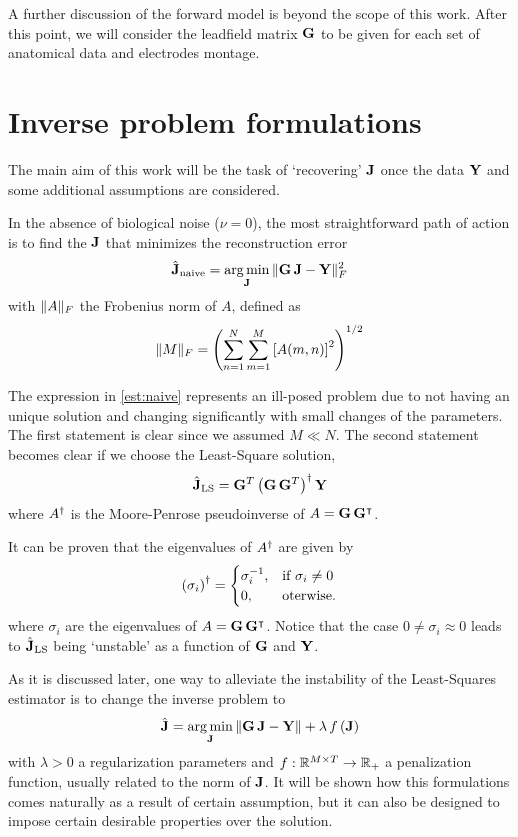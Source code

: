 A further discussion of the forward model is beyond the scope of this work.
%
After this point, we will consider the leadfield matrix $\mathbf{G}$ to be given for each set of anatomical data and electrodes montage.

\section{Inverse problem formulations}

The main aim of this work will be the task of `recovering' $\mathbf{J}$ once the data $\mathbf{Y}$ and some additional assumptions are considered.

In the absence of biological noise ($\nu = 0$),
the most straightforward path of action is to find the $\mathbf{J}$ that minimizes the reconstruction error
\begin{equation}
\hat{\J}_{\text{naive}} =
\argmin_{\J}\, \nnorm{\G\, \J- \Y}_F^2 %
\label{est:naive}
\end{equation}
with $\lVert A \rVert_F$ the Frobenius norm of $A$, defined as
\begin{equation}
\lVert M \rVert_F =
\left( 
\sum_{n=1}^N \sum_{m=1}^M \left[ A(m,n) \right]^2
 \right)^{1/2}
\end{equation}

The expression in \eqref{est:naive} represents
an ill-posed problem due to not having an unique solution and changing significantly with small changes of the parameters.
%
The first statement is clear since we assumed $M\ll N$.
%
The second statement becomes clear if we choose the Least-Square solution,
\begin{equation}
\hat{\mathbf{J}}_{\text{LS}} =
\mathbf{G}^T \left( \mathbf{G}\, \mathbf{G}^T \right)^\dagger \mathbf{Y}
\end{equation}
where $A^\dagger$ is the Moore-Penrose pseudoinverse of $A=\mathbf{G}\, \mathbf{G}^\intercal$.

It can be proven that the eigenvalues of $A^\dagger$ are given by
\begin{equation}
\left( \sigma_i \right)^\dagger =
\begin{cases}
\sigma_i^{-1}, &\text{if } \sigma_i\neq 0 \\
0, &\text{oterwise}.
\end{cases}
\end{equation}
where $\sigma_i$ are the eigenvalues of $A=\mathbf{G}\, \mathbf{G}^\intercal$. 
%
Notice that the case $0\neq \sigma_i \approx 0$ leads to $\hat{\mathbf{J}}_{\text{LS}}$ being `unstable' as a function of $\mathbf{G}$ and $\mathbf{Y}$.

As it is discussed later, one way to alleviate the instability of the Least-Squares estimator is to change the inverse problem to
\begin{equation}
\hat{\mathbf{J}} = \operatorname*{arg\,min}_{\mathbf{J}}\, \lVert \mathbf{G}\, \mathbf{J} - \mathbf{Y} \rVert + \lambda\, f\left( \mathbf{J} \right)
\label{est:gral}
\end{equation}
with $\lambda>0$ a regularization parameters and
$f: \mathbb{R}^{M\times T} \rightarrow \mathbb{R}_+$ a penalization function, usually related to the norm of $\mathbf{J}$.
%
It will be shown how this formulations comes naturally as a result of certain assumption, but it can also be designed to impose certain desirable properties over the solution.

